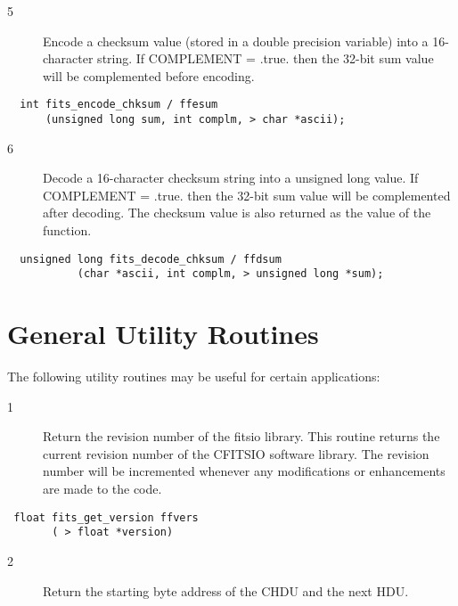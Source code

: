 \begin{description}
\item[5 ] Encode a checksum value (stored in a double precision variable)
    into a 16-character string.  If COMPLEMENT = .true. then the 32-bit
   sum value will be complemented before encoding.
\end{description}

\begin{verbatim}
  int fits_encode_chksum / ffesum
      (unsigned long sum, int complm, > char *ascii);
\end{verbatim}

\begin{description}
\item[6 ] Decode a 16-character checksum string into a unsigned long value.
    If COMPLEMENT = .true. then the 32-bit sum value will be complemented
    after decoding.  The checksum value is also returned as the
   value of the function.
\end{description}

\begin{verbatim}
  unsigned long fits_decode_chksum / ffdsum
           (char *ascii, int complm, > unsigned long *sum);
\end{verbatim}


\section{General Utility Routines \label{FFVERS}}

The following utility routines may be useful for certain applications:


\begin{description}
\item[1 ] Return the revision number of the fitsio library.
    This routine returns the current revision number of the CFITSIO
    software library.  The revision number will be incremented whenever any
   modifications or enhancements are made to the code.
\end{description}

\begin{verbatim}
 float fits_get_version ffvers
       ( > float *version)
\end{verbatim}

\begin{description}
\item[2 ] Return the starting byte address of the CHDU and the next HDU.
\end{description}

